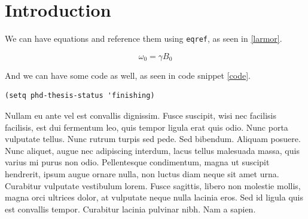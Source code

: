\documentclass[a4paper,12pt,oneside,print,numbered,index,PageStyleIII]{PhDThesisPSnPDF}
\date{}
\title{}
\begin{document}
\frontmatter

\begin{titlepage}

\maketitle

\end{titlepage}


%










\tableofcontents

\listoffigures

\listoftables

\mainmatter


\chapter{Introduction}
\label{sec:org500ebb9}
\label{ch:Intro}

We can have equations and reference them using \texttt{eqref}, as seen in \eqref{larmor}.

\begin{equation}
\omega_{0} = \gamma B_{0} \label{larmor}
\end{equation}


And we can have some code as well, as seen in code snippet \ref{code}.

\begin{verbatim}
(setq phd-thesis-status 'finishing)
\end{verbatim}


Nullam eu ante vel est convallis dignissim.  Fusce suscipit, wisi nec facilisis facilisis, est dui fermentum leo, quis tempor ligula erat quis odio.  Nunc porta vulputate tellus.  Nunc rutrum turpis sed pede.  Sed bibendum.  Aliquam posuere.  Nunc aliquet, augue nec adipiscing interdum, lacus tellus malesuada massa, quis varius mi purus non odio.  Pellentesque condimentum, magna ut suscipit hendrerit, ipsum augue ornare nulla, non luctus diam neque sit amet urna.  Curabitur vulputate vestibulum lorem.  Fusce sagittis, libero non molestie mollis, magna orci ultrices dolor, at vulputate neque nulla lacinia eros.  Sed id ligula quis est convallis tempor.  Curabitur lacinia pulvinar nibh.  Nam a sapien.
\end{document}
